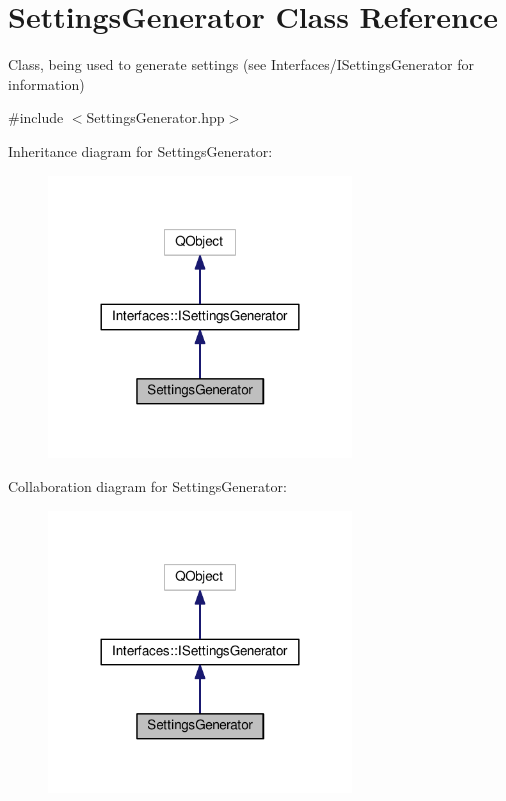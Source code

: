 \hypertarget{class_settings_generator}{}\section{Settings\+Generator Class Reference}
\label{class_settings_generator}


Class, being used to generate settings (see Interfaces/\+I\+Settings\+Generator for information)  




{\ttfamily \#include $<$Settings\+Generator.\+hpp$>$}



Inheritance diagram for Settings\+Generator\+:\nopagebreak
\begin{figure}[H]
\begin{center}
\leavevmode
\includegraphics[width=228pt]{class_settings_generator__inherit__graph}
\end{center}
\end{figure}


Collaboration diagram for Settings\+Generator\+:\nopagebreak
\begin{figure}[H]
\begin{center}
\leavevmode
\includegraphics[width=228pt]{class_settings_generator__coll__graph}
\end{center}
\end{figure}
